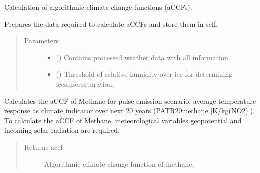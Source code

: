 \documentclass[a4paper,11pt,english]{sphinxmanual}
\begin{document}
\begin{fulllineitems}
\label{\detokenize{modules:envlib.accf.GeTaCCFs}}
Calculation of algorithmic climate change functions (aCCFs).

\begin{fulllineitems}
\label{\detokenize{modules:envlib.accf.GeTaCCFs.__init__}}
Prepares the data required to calculate aCCFs and store them in self.
\begin{quote}\begin{description}
\item[{Parameters}] \leavevmode\begin{itemize}
\item {} 
 () \textendash{} Contains processed weather data with all information.

\item {} 
 () \textendash{} Threshold of relative humidity over ice for determining ice\sphinxhyphen{}supersaturation.

\end{itemize}

\end{description}\end{quote}

\end{fulllineitems}


\begin{fulllineitems}
\label{\detokenize{modules:envlib.accf.GeTaCCFs.accf_ch4}}
Calculates the aCCF of Methane for pulse emission scenario, average temperature response as climate
indicator over next 20 years (P\sphinxhyphen{}ATR20\sphinxhyphen{}methane {[}K/kg(NO2){]}). To calculate the aCCF of Methane, meteorological
variables geopotential and incoming solar radiation are required.
\begin{quote}\begin{description}
\item[{Returns accf}] \leavevmode
Algorithmic climate change function of methane.


\end{description}
\end{quote}
\end{fulllineitems}
\end{fulllineitems}
\end{document}

